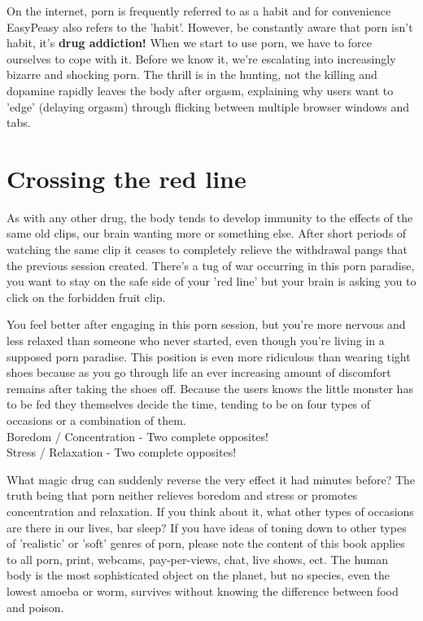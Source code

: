 \documentclass[easypeasy.tex]{subfiles}
\begin{document}
On the internet, porn is frequently referred to as a habit and for convenience EasyPeasy also refers to the 'habit'. However, be constantly aware that porn isn't habit, it's \textbf{drug addiction!} When we start to use porn, we have to force ourselves to cope with it. Before we know it, we're escalating into increasingly bizarre and shocking porn. The thrill is in the hunting, not the killing and dopamine rapidly leaves the body after orgasm, explaining why users want to 'edge' (delaying orgasm) through flicking between multiple browser windows and tabs.

\section{Crossing the red line}
As with any other drug, the body tends to develop immunity to the effects of the same old clips, our brain wanting more or something else. After short periods of watching the same clip it ceases to completely relieve the withdrawal pangs that the previous session created. There's a tug of war occurring in this porn paradise, you want to stay on the safe side of your 'red line' but your brain is asking you to click on the forbidden fruit clip.

You feel better after engaging in this porn session, but you're more nervous and less relaxed than someone who never started, even though you're living in a supposed porn paradise. This position is even more ridiculous than wearing tight shoes because as you go through life an ever increasing amount of discomfort remains after taking the shoes off. Because the users knows the little monster has to be fed they themselves decide the time, tending to be on four types of occasions or a combination of them. \\
  Boredom / Concentration - Two complete opposites! \\
  Stress / Relaxation - Two complete opposites!

What magic drug can suddenly reverse the very effect it had minutes before? The truth being that porn neither relieves boredom and stress or promotes concentration and relaxation. If you think about it, what other types of occasions are there in our lives, bar sleep? If you have ideas of toning down to other types of 'realistic' or 'soft' genres of porn, please note the content of this book applies to all porn, print, webcams, pay-per-views, chat, live shows, ect. The human body is the most sophisticated object on the planet, but no species, even the lowest amoeba or worm, survives without knowing the difference between food and poison.
\end{document}
